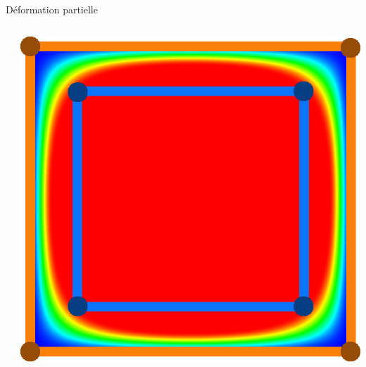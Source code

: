 \documentclass[xcolor=x11names,compress]{beamer}
\renewcommand{\(}{\begin{columns}} \renewcommand{\)}{\end{columns}}
\newcommand{\<}[1]{\begin{column}{#1}} \renewcommand{\>}{\end{column}}
\begin{document}
\begin{frame}{Déformation partielle}
\begin{columns}[t]
\begin{column}{0.3\textwidth}
    \end{column}
    \begin{column}{0.3\textwidth}
      \includegraphics[scale=0.15]{BoundaryWeightFunction-Grande}
    \end{column}
  \end{columns}
\end{frame}
\end{document}
